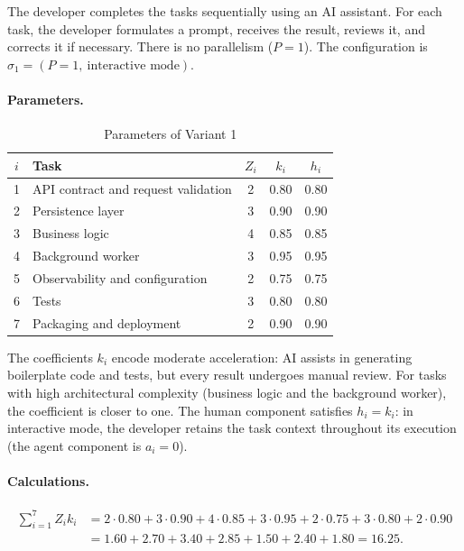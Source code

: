
The developer completes the tasks sequentially using an AI assistant. For each
task, the developer formulates a prompt, receives the result, reviews it, and
corrects it if necessary. There is no parallelism
($P = 1$). The configuration is
$\sigma_1 = (P{=}1,\ \text{interactive mode})$.

\paragraph{Parameters.}
\begin{table}[ht!]
\centering
\caption{Parameters of Variant 1}
\label{tab:practical-v1-params}
\begin{tabular}{clccc}
\toprule
$i$ & Task & $Z_i$ & $k_i$ & $h_i$ \\
\midrule
1 & API contract and request validation & 2 & 0.80 & 0.80 \\
2 & Persistence layer & 3 & 0.90 & 0.90 \\
3 & Business logic & 4 & 0.85 & 0.85 \\
4 & Background worker & 3 & 0.95 & 0.95 \\
5 & Observability and configuration & 2 & 0.75 & 0.75 \\
6 & Tests & 3 & 0.80 & 0.80 \\
7 & Packaging and deployment & 2 & 0.90 & 0.90 \\
\bottomrule
\end{tabular}
\end{table}

The coefficients $k_i$ encode moderate acceleration: AI assists in generating
boilerplate code and tests, but every result undergoes manual review. For tasks
with high architectural complexity (business logic and the background worker),
the coefficient is closer to one. The human component satisfies $h_i = k_i$:
in interactive mode, the developer retains the task context throughout its
execution (the agent component is $a_i = 0$).

\paragraph{Calculations.}
\begin{align*}
  \sum_{i=1}^{7} Z_i k_i &= 2{\cdot}0.80 + 3{\cdot}0.90 + 4{\cdot}0.85 + 3{\cdot}0.95 + 2{\cdot}0.75 + 3{\cdot}0.80 + 2{\cdot}0.90 \\
  &= 1.60 + 2.70 + 3.40 + 2.85 + 1.50 + 2.40 + 1.80 = 16.25.
\end{align*}

